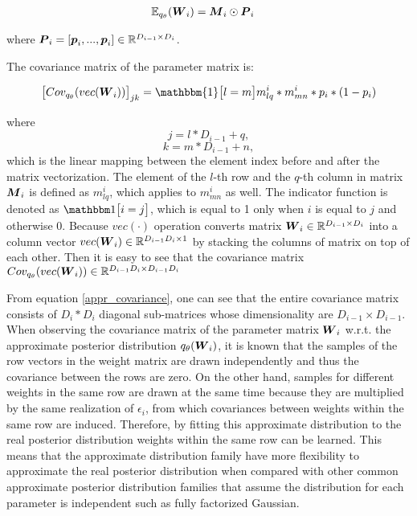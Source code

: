 \begin{equation}
\begin{aligned} \label{appr_expectation}
\mathbb E_{q_{\theta}}(\boldsymbol W_{i}) & = \boldsymbol M_{i} \odot \boldsymbol P_{i}
\end{aligned}
\end{equation}

where $\boldsymbol P_{i} = [\boldsymbol p_{i}, ..., \boldsymbol p_{i}] \in \mathbb R^{D_{i-1} \times D_{i}}$.

The covariance matrix of the parameter matrix is:

\begin{equation}
\begin{aligned} \label{appr_covariance}
\big[Cov_{q_{\theta}}(vec(\bld W_{i}))\big]_{jk}   = \mathbbm{1} \big[l=m\big] m^{i}_{lq}*m^{i}_{mn}*p_{i}*(1-p_{i})
\end{aligned}
\end{equation}

where 
\[ j = l*D_{i-1} + q,\]
\[ k = m*D_{i-1} + n,\]
which is the linear mapping between the element index before and after the matrix vectorization. The element of the $l$-th row and the $q$-th column in matrix $\boldsymbol M_{i}$ is defined as $m^{i}_{lq}$, which applies to $m^{i}_{mn}$ as well. 
The indicator function is denoted as $\mathbbm 1 \big[i=j\big]$, which is equal to 1 only when $i$ is equal to $j$ and otherwise 0. Because $vec(\cdot)$ operation converts matrix $\boldsymbol W_{i} \in \mathbb R^{D_{i-1} \times D_{i}}$ into a column vector $ vec(\boldsymbol W_{i}) \in \mathbb R^{D_{i-1}D_{i} \times 1}$ by stacking the columns of matrix on top of each other. Then it is easy to see that the covariance matrix $Cov_{q_{\theta}}(vec(\boldsymbol W_{i})) \in \mathbb R^{D_{i-1}D_{i} \times D_{i-1}D_{i}} $ 

From equation \ref{appr_covariance}, one can see that the entire covariance matrix consists of $D_{i} \ast D_{i}$ diagonal sub-matrices whose dimensionality are $D_{i-1} \times D_{i-1}$.
When observing the covariance matrix of the parameter matrix $\boldsymbol W_{i}$ w.r.t. the approximate posterior distribution $q_{\theta}({\boldsymbol W_{i}})$, it is known that the samples of the row vectors in the weight matrix are drawn independently and thus the covariance between the rows are zero. On the other hand, samples for different weights in the same row are drawn at the same time because they are multiplied by the same realization of $\epsilon_{i}$, from which covariances between weights within the same row are induced. Therefore, by fitting this approximate distribution to the real posterior distribution weights within the same row can be learned. This means that the approximate distribution family have more flexibility to approximate the real posterior distribution when compared with other common approximate posterior distribution families that assume the distribution for each parameter is independent such as fully factorized Gaussian.


